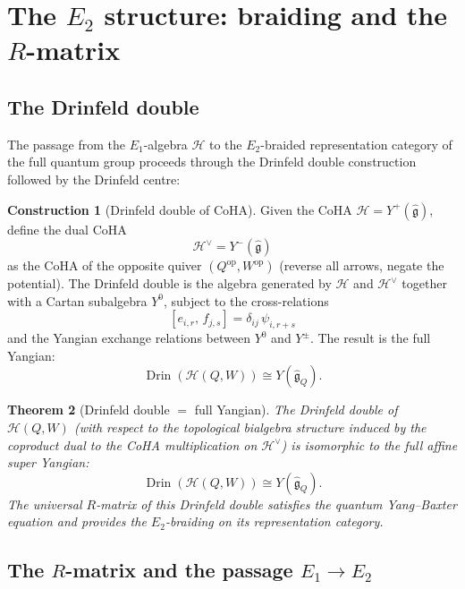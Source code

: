 \documentclass[11pt]{article}
\newtheorem{theorem}{Theorem}[section]
\theoremstyle{definition}
\newtheorem{construction}[theorem]{Construction}
\theoremstyle{remark}
\newcommand{\CoHA}{\mathcal{H}}
\newcommand{\frakg}{\mathfrak{g}}
\newcommand{\op}{\operatorname{op}}
\begin{document}
\section{The $E_2$ structure: braiding and the $R$-matrix}
\label{sec:e2-structure}

\subsection{The Drinfeld double}
\label{subsec:drinfeld-double}

The passage from the $E_1$-algebra $\CoHA$ to the $E_2$-braided
representation category of the full quantum group proceeds through the
Drinfeld double construction followed by the Drinfeld centre:

\begin{construction}[Drinfeld double of CoHA]
\label{constr:drinfeld-double}
Given the CoHA $\CoHA = Y^+(\widehat{\frakg})$, define the dual CoHA
\[
 \CoHA^{\vee} = Y^-(\widehat{\frakg})
\]
as the CoHA of the opposite quiver $(Q^{\op}, W^{\op})$ (reverse all arrows,
negate the potential). The Drinfeld double is the algebra generated by $\CoHA$
and $\CoHA^{\vee}$ together with a Cartan subalgebra $Y^0$, subject to the
cross-relations
\[
 [e_{i,r},\, f_{j,s}] = \delta_{ij}\, \psi_{i, r+s}
\]
and the Yangian exchange relations between $Y^0$ and $Y^{\pm}$. The result
is the full Yangian:
\[
 \operatorname{Drin}(\CoHA(Q,W)) \cong Y(\widehat{\frakg}_{Q}).
\]
\end{construction}

\begin{theorem}[Drinfeld double $=$ full Yangian]
\label{thm:drinfeld-double}
The Drinfeld double of $\CoHA(Q,W)$ (with respect to the topological bialgebra
structure induced by the coproduct dual to the CoHA multiplication on
$\CoHA^{\vee}$) is isomorphic to the full affine super Yangian:
\[
 \operatorname{Drin}(\CoHA(Q,W)) \cong Y(\widehat{\frakg}_{Q}).
\]
The universal $R$-matrix of this Drinfeld double satisfies the quantum
Yang--Baxter equation and provides the $E_2$-braiding on its
representation category.
\end{theorem}


\subsection{The $R$-matrix and the passage $E_1 \to E_2$}
\label{subsec:r-matrix}
\end{document}
